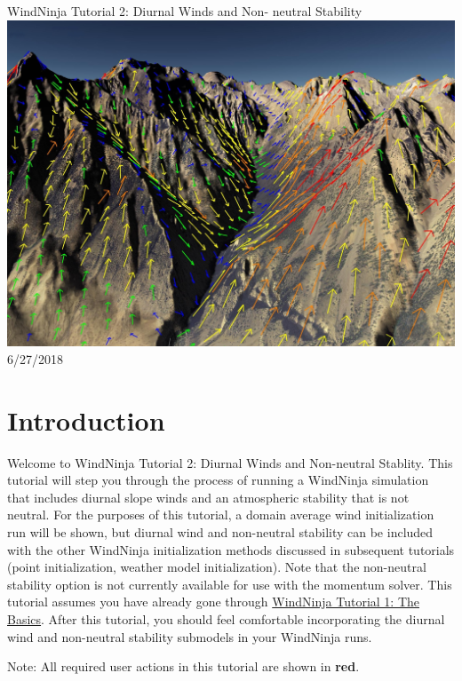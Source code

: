 \documentclass[12pt]{article}
\begin{document}
\begin{titlepage}
    \centering
    {\Huge
       WindNinja Tutorial 2: Diurnal Winds and Non-				neutral Stability
    }    
    \vfill
    \includegraphics[scale=0.2]								{imgs/title_fig.jpg}
    \vfill
  	{\Huge
	  6/27/2018 %
  	}
    \vfill
\end{titlepage}

\section*{Introduction}
Welcome to WindNinja Tutorial 2: Diurnal Winds and Non-neutral Stablity.  This tutorial will step you through the process of running a WindNinja simulation that includes diurnal slope winds and an atmospheric stability that is not neutral.  For the purposes of this tutorial, a domain average wind initialization run will be shown, but diurnal wind and non-neutral stability can be included with the other WindNinja initialization methods discussed in subsequent tutorials (point initialization, weather model initialization).  Note that the non-neutral stability option is not currently available for use with the momentum solver. This tutorial assumes you have already gone through \href{https://weather.firelab.org/windninja/tutorials/WindNinja_tutorial1.pdf}{WindNinja Tutorial 1: The Basics}.  After this tutorial, you should feel comfortable incorporating the diurnal wind and non-neutral stability submodels in your WindNinja runs.

Note:  All required user actions in this tutorial are shown in  \textbf{\color{red} red}.
\end{document}
